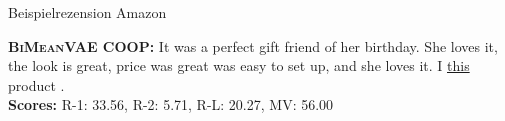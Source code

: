\begin{frame}{Beispielrezension Amazon}
\begin{Rezension}[!h]
{{        %
        \textbf{\textsc{BiMeanVAE} COOP:} \textcolor{HighlightColor}{It} was \textcolor{HighlightColor}{a} perfect gift \ccolorbox[BackgroundColor]{ \textcolor{HighlightColor}{for a}} friend \textcolor{HighlightColor}{of} her birthday\textcolor{HighlightColor}{.} She loves \textcolor{HighlightColor}{it}\textcolor{HighlightColor}{,} \textcolor{HighlightColor}{the} \textcolor{HighlightColor}{look} \textcolor{HighlightColor}{is} \textcolor{HighlightColor}{great}\textcolor{HighlightColor}{,} \ccolorbox[BackgroundColor]{ \textcolor{HighlightColor}{and the}} \textcolor{HighlightColor}{price} was \textcolor{HighlightColor}{great}\ccolorbox[BackgroundColor]{\textcolor{HighlightColor}{. It}} was easy \textcolor{HighlightColor}{to} set up\textcolor{HighlightColor}{,} \textcolor{HighlightColor}{and} she loves it. I \underline{\ccolorbox[BackgroundColor]{ \textcolor{HighlightColor}{would recommend}} \textcolor{HighlightColor}{this}} product \ccolorbox[BackgroundColor]{ \textcolor{HighlightColor}{to anyone}}\textcolor{HighlightColor}{.}   \\ 
        \textbf{Scores:} R-1: 33.56, R-2: 5.71, R-L: 20.27, MV: 56.00 \\ \\
    

}}
\end{Rezension}
\end{frame}
